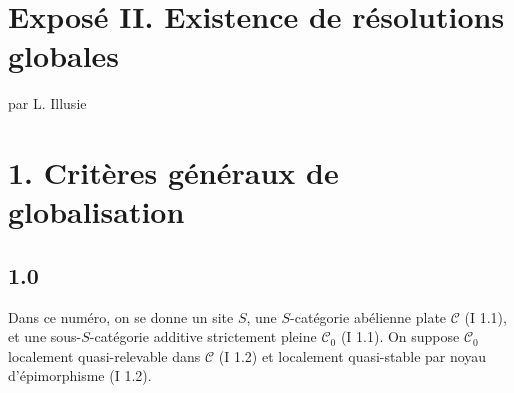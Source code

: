 \documentclass[11pt]{article}
\begin{document}
\providecommand{\cS}{\mathcal S}
\providecommand{\cCz}{\mathcal C_0}
\providecommand{\cCone}{\mathcal C_1}
\providecommand{\cA}{\mathcal A}
\providecommand{\cB}{\mathcal B}
\providecommand{\cL}{\mathcal L}
\providecommand{\cI}{\mathcal I}
\providecommand{\cJ}{\mathcal J}
\providecommand{\Db}{\mathrm D}
\providecommand{\Kb}{\mathrm K}
\providecommand{\Dminus}{\mathrm D^{-}}
\providecommand{\Kminus}{\mathrm K^{-}}
\providecommand{\Kbd}{\mathrm K^{b}}
\providecommand{\Mod}{\operatorname{Mod}}
\providecommand{\Lib}{\operatorname{Lib}}
\providecommand{\Loclib}{\operatorname{Loclib}}
\providecommand{\Qcoh}{\operatorname{Qcoh}}
\providecommand{\Coh}{\operatorname{Coh}}
\providecommand{\Ext}{\operatorname{Ext}}
\providecommand{\Hom}{\operatorname{Hom}}
\providecommand{\Ob}{\operatorname{ob}}
\providecommand{\im}{\operatorname{Im}}
\providecommand{\coker}{\operatorname{Coker}}
\providecommand{\coh}{\operatorname{coh}}
\providecommand{\parf}{\operatorname{parf}}
\providecommand{\amp}{\operatorname{amp}}
\providecommand{\RHom}{\operatorname{RHom}}


\section*{Exposé II. Existence de résolutions globales}
\begin{center}
par L. Illusie
\end{center}

\section*{1. Critères généraux de globalisation}

\subsection*{1.0}
Dans ce numéro, on se donne un site $S$, une $S$-catégorie abélienne plate $\mathcal C$ (I 1.1), et une sous-$S$-catégorie additive strictement pleine $\mathcal C_0$ (I 1.1). On suppose $\mathcal C_0$ localement quasi-relevable dans $\mathcal C$ (I 1.2) et localement quasi-stable par noyau d'épimorphisme (I 1.2).
\end{document}
